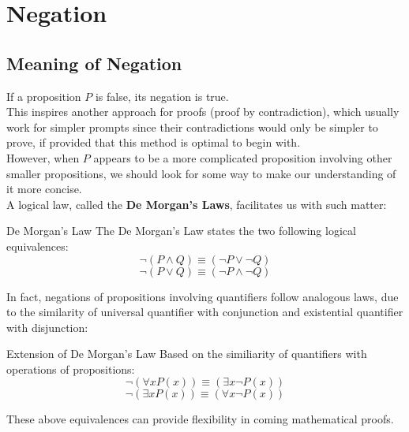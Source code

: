 \section{Negation}
\subsection{Meaning of Negation}
If a proposition $P$ is false, its negation is true. \\
This inspires another approach for proofs (proof by contradiction), which usually work for simpler prompts since their contradictions would only be simpler to prove, if provided that this method is optimal to begin with. \\
However, when $P$ appears to be a more complicated proposition involving other smaller propositions, we should look for some way to make our understanding of it more concise. \\
A logical law, called the \textbf{De Morgan's Laws}, facilitates us with such matter:
\begin{ln-axiom}{De Morgan's Law}{}
    The De Morgan's Law states the two following logical equivalences:
    \[\neg (P \land Q) \equiv (\neg P \lor \neg Q)\]
    \[\neg (P \lor Q) \equiv (\neg P \land \neg Q)\]
\end{ln-axiom}
In fact, negations of propositions involving quantifiers follow analogous laws, due to the similarity of universal quantifier with conjunction and existential quantifier with disjunction:
\begin{ln-axiom}{Extension of De Morgan's Law}{}
    Based on the similiarity of quantifiers with operations of propositions:
    \[\neg (\forall x P(x)) \equiv (\exists x \neg P(x))\]
    \[\neg (\exists x P(x)) \equiv (\forall x \neg P(x))\]
\end{ln-axiom}
These above equivalences can provide flexibility in coming mathematical proofs.

